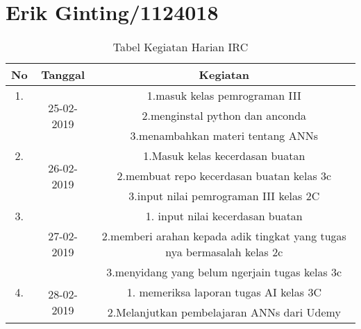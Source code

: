 \chapter{Erik Ginting/1124018}

\begin{table}[h]
\caption{Tabel Kegiatan Harian IRC}
\centering
\begin{tabular}{|c|c|c|}
\hline
No&Tanggal&Kegiatan\\
\hline
1.&\multirow{3}{*}{25-02-2019}&1.masuk kelas pemrograman III\\
&&2.menginstal python dan anconda\\
&&3.menambahkan materi tentang ANNs\\
\hline
2.&\multirow{3}{*}{26-02-2019}&1.Masuk kelas kecerdasan buatan\\
&&2.membuat repo kecerdasan buatan kelas 3c\\
&&3.input nilai pemrograman III kelas 2C\\
\hline
3.&\multirow{3}{*}{27-02-2019}&1. input nilai kecerdasan buatan\\
&&2.memberi arahan kepada adik tingkat yang tugas nya bermasalah kelas 2c\\
&&3.menyidang yang belum ngerjain tugas kelas 3c\\
\hline
4.&\multirow{2}{*}{28-02-2019}&1. memeriksa laporan tugas AI kelas 3C\\
&&2.Melanjutkan pembelajaran ANNs dari Udemy \\
\hline
\end{tabular}
\label{table:contoh}
\end{table} 

